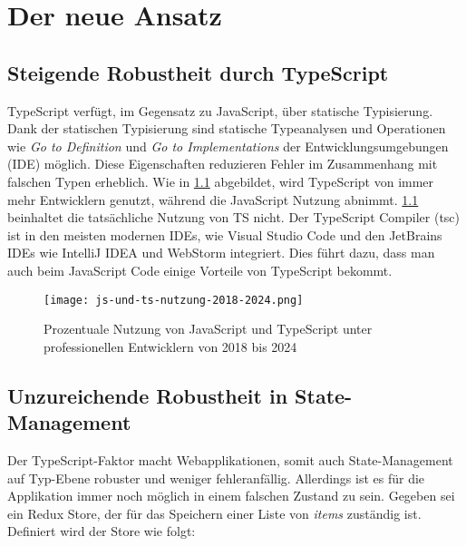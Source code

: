 \chapter{Der neue Ansatz} \label{der-neue-ansatz}

\section{Steigende Robustheit durch TypeScript}

TypeScript verfügt, im Gegensatz zu JavaScript, über statische Typisierung. Dank der statischen Typisierung sind statische Typeanalysen und Operationen wie \textit{Go to Definition} und \textit{Go to Implementations} der Entwicklungsumgebungen (IDE) möglich. Diese Eigenschaften reduzieren Fehler im Zusammenhang mit falschen Typen erheblich. Wie in \ref{fig:js-und-ts-nutzung-2018-2024} abgebildet, wird TypeScript von immer mehr Entwicklern genutzt, während die JavaScript Nutzung abnimmt. \ref{fig:js-und-ts-nutzung-2018-2024} beinhaltet die tatsächliche Nutzung von TS nicht. Der TypeScript Compiler (tsc) ist in den meisten modernen IDEs, wie Visual Studio Code und den JetBrains IDEs wie IntelliJ IDEA und WebStorm integriert. Dies führt dazu, dass man auch beim JavaScript Code einige Vorteile von TypeScript bekommt.\cite{typeScriptDocumentary}

\begin{figure}[H]
  \texttt{[image: js-und-ts-nutzung-2018-2024.png]}
  \caption{Prozentuale Nutzung von JavaScript und TypeScript unter professionellen Entwicklern von 2018 bis 2024}
  \label{fig:js-und-ts-nutzung-2018-2024}
\end{figure}


\section {Unzureichende Robustheit in State-Management}

Der TypeScript-Faktor macht Webapplikationen, somit auch State-Management auf Typ-Ebene robuster und weniger fehleranfällig. Allerdings ist es für die Applikation immer noch möglich in einem falschen Zustand zu sein. Gegeben sei ein Redux Store, der für das Speichern einer Liste von \textit{items} zuständig ist. Definiert wird der Store wie folgt:

